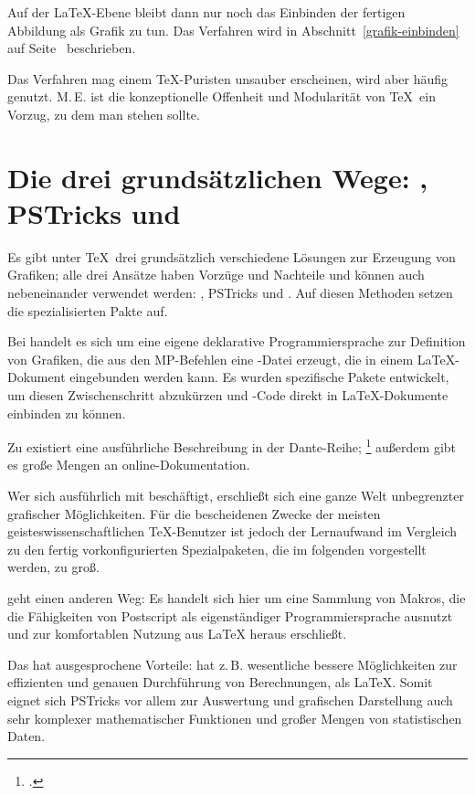 Auf der \LaTeX-Ebene bleibt dann nur noch das Einbinden der fertigen Abbildung als Grafik zu
tun. Das Verfahren wird in Abschnitt~\ref{grafik-einbinden} auf Seite~\pageref{grafik-einbinden}
beschrieben.

Das Verfahren mag einem \TeX-Puristen unsauber erscheinen, wird aber häufig genutzt.
M.\,E. ist die konzeptionelle Offenheit und Modularität von \TeX\ ein Vorzug, zu dem man stehen sollte.


\section{Die drei grundsätzlichen Wege: \METAPOST, PSTricks und \TikZ}

Es gibt unter \TeX\ drei grundsätzlich verschiedene Lösungen zur Erzeugung von Grafiken;
alle drei Ansätze haben Vorzüge und Nachteile und können auch nebeneinander verwendet werden:
\METAPOST, PSTricks und \TikZ. Auf diesen Methoden setzen die spezialisierten Pakte auf.

Bei \METAPOST{} handelt es sich um eine eigene deklarative Programmiersprache zur Definition
von Grafiken, die aus den MP-Befehlen eine \PS-Datei erzeugt, die in einem \LaTeX-Dokument
eingebunden werden kann.
Es wurden spezifische Pakete entwickelt, um diesen Zwischenschritt abzukürzen und 
\METAPOST-Code direkt in \LaTeX -Dokumente einbinden zu können.

Zu \METAPOST{} existiert eine ausführliche Beschreibung in der Dante-Reihe;%
\footcite{entenmann:metapost}
außerdem gibt es große Mengen an online-Dokumentation.

Wer sich ausführlich mit \METAPOST{} beschäftigt, erschließt sich eine ganze Welt unbegrenzter
grafischer Möglichkeiten. Für die bescheidenen Zwecke der meisten geisteswissenschaftlichen
\TeX-Benutzer ist jedoch der Lernaufwand im Vergleich zu den fertig vorkonfigurierten Spezialpaketen,
die im folgenden vorgestellt werden, zu groß.


 geht einen anderen Weg: Es handelt sich hier um eine Sammlung von Makros, die die
Fähigkeiten von Postscript als eigenständiger Programmiersprache ausnutzt und zur komfortablen
Nutzung aus \LaTeX{} heraus erschließt.

Das hat ausgesprochene Vorteile: \PS{} hat z.\,B. wesentliche bessere Möglichkeiten zur
effizienten und genauen Durchführung von Berechnungen, als \LaTeX{}.
Somit eignet sich PSTricks vor allem zur Auswertung und grafischen Darstellung auch sehr komplexer
mathematischer Funktionen und großer Mengen von statistischen Daten. 


